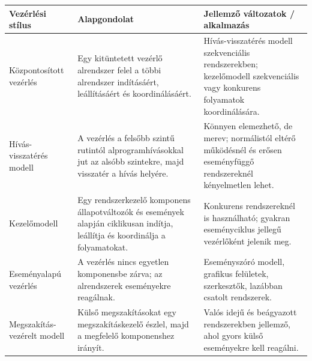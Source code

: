 \begin{tabularx}{\textwidth}{L{34mm}X X}
\toprule
\textbf{Vezérlési stílus} & \textbf{Alapgondolat} & \textbf{Jellemző változatok / alkalmazás} \\
\midrule
Központosított vezérlés & Egy kitüntetett vezérlő alrendszer felel a többi alrendszer indításáért, leállításáért és koordinálásáért. & Hívás-visszatérés modell szekvenciális rendszerekben; kezelőmodell szekvenciális vagy konkurens folyamatok koordinálására. \\
Hívás-visszatérés modell & A vezérlés a felsőbb szintű rutintól alprogramhívásokkal jut az alsóbb szintekre, majd visszatér a hívás helyére. & Könnyen elemezhető, de merev; normálistól eltérő működésnél és erősen eseményfüggő rendszereknél kényelmetlen lehet. \\
Kezelőmodell & Egy rendszerkezelő komponens állapotváltozók és események alapján ciklikusan indítja, leállítja és koordinálja a folyamatokat. & Konkurens rendszereknél is használható; gyakran eseményciklus jellegű vezérlőként jelenik meg. \\
Eseményalapú vezérlés & A vezérlés nincs egyetlen komponensbe zárva; az alrendszerek eseményekre reagálnak. & Eseményszóró modell, grafikus felületek, szerkesztők, lazábban csatolt rendszerek. \\
Megszakítás-vezérelt modell & Külső megszakításokat egy megszakításkezelő észlel, majd a megfelelő komponenshez irányít. & Valós idejű és beágyazott rendszerekben jellemző, ahol gyors külső eseményekre kell reagálni. \\
\bottomrule
\end{tabularx}
